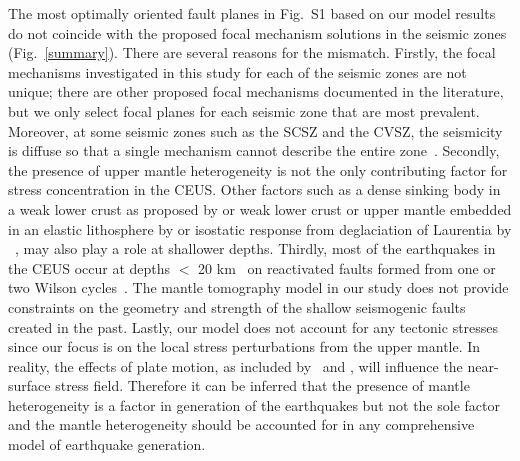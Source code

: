 \documentclass[draft,linenumbers]{agujournal2018}
\begin{document}
     The most optimally oriented fault planes in Fig.~S1 based on our model results do not coincide with the proposed focal mechanism solutions in the seismic zones (Fig.~\ref{summary}). There are several reasons for the mismatch. Firstly, the focal mechanisms investigated in this study for each of the seismic zones are not unique; there are other proposed focal mechanisms documented in the literature, but we only select focal planes for each seismic zone that are most prevalent. Moreover, at some seismic zones such as the SCSZ and the CVSZ, the seismicity is diffuse so that a single mechanism cannot describe the entire zone~\citep{johnson2014earthquake, munsey1985focal, madabhushi1993fault}.  Secondly, the presence of upper mantle heterogeneity is not the only contributing factor for stress concentration in the CEUS. Other factors such as a dense sinking body in a weak lower crust as proposed by \citet{Pollitz_2001} or weak lower crust or upper mantle embedded in an elastic lithosphere by \citet{Kenner_2000a} or isostatic response from deglaciation of Laurentia by ~\citet{Grollimund_2001}, may also play a role at shallower depths.  Thirdly, most of the earthquakes in the CEUS occur at depths $<$ 20 km~\citep[e.g.,][]{bollinger1985seismicity, chiu1992imaging, powell2016grenville} on reactivated faults formed from one or two Wilson cycles~\citep{thomas2006tectonic, wolin2012mineral}. The mantle tomography model in our study does not provide constraints on the geometry and strength of the shallow seismogenic faults created in the past. Lastly, our model does not account for any tectonic stresses since our focus is on the local stress perturbations from the upper mantle. In reality, the effects of plate motion, as included by~\citet{zhan2016stress} and \citet{levandowski2016dense}, will influence the near-surface stress field.%
Therefore it can be inferred that the presence of mantle heterogeneity is a factor in generation of the earthquakes but not the sole factor and the mantle heterogeneity should be accounted for in any comprehensive model of earthquake generation.
     
\end{document}
